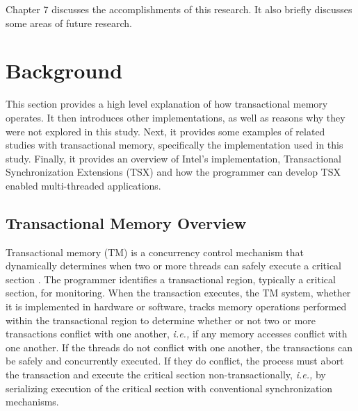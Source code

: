\documentclass[11pt]{book}
\begin{document}
Chapter 7 discusses the accomplishments of this research.  It also briefly discusses some
areas of future research.


\chapter{Background}

This section provides a high level explanation of how transactional memory operates.  It
then introduces other implementations, as well as reasons why they were not explored in
this study.  Next, it provides some examples of related studies with transactional memory,
specifically the implementation used in this study.  Finally, it provides an overview of
Intel's implementation, Transactional Synchronization Extensions (TSX) and how the
programmer can develop TSX enabled multi-threaded applications.

\section{Transactional Memory Overview}

Transactional memory (TM) is a concurrency control mechanism that dynamically determines
when two or more threads can safely execute a critical section \cite{sle_rajwar}.  The
programmer identifies a transactional region, typically a critical section, for
monitoring.  When the transaction executes, the TM system, whether it is implemented in
hardware or software, tracks memory operations performed within the transactional region
to determine whether or not two or more transactions conflict with one another,
\emph{i.e.,} if any memory accesses conflict with one another.  If the threads do not
conflict with one another, the transactions can be safely and concurrently executed.  If
they do conflict, the process must abort the transaction and execute the critical section
non-transactionally, \emph{i.e.,} by serializing execution of the critical section with
conventional synchronization mechanisms.

\end{document}
